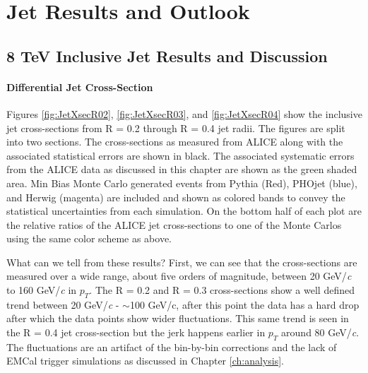 \chapter{Jet Results and Outlook} \label{ch:cando}

\section{8 TeV Inclusive Jet Results and Discussion}

\subsubsection{Differential Jet Cross-Section}


\noindent
Figures \ref{fig:JetXsecR02}, \ref{fig:JetXsecR03}, and \ref{fig:JetXsecR04} show the inclusive jet cross-sections from R = 0.2 through R = 0.4 jet radii.  The figures are split into two sections.  The cross-sections as measured from ALICE along with the associated statistical errors are shown in black.  The associated systematic errors from the ALICE data as discussed in this chapter are shown as the green shaded area.  Min Bias Monte Carlo generated events from Pythia (Red), PHOjet (blue), and Herwig (magenta) are included and shown as colored bands to convey the statistical uncertainties from each simulation.  On the bottom half of each plot are the relative ratios of the ALICE jet cross-sections to one of the Monte Carlos using the same color scheme as above.  

What can we tell from these results?  First, we can see that the cross-sections are measured over a wide range, about five orders of magnitude, between 20 GeV/\textit{c} to 160 GeV/\textit{c} in $p_{T}$.  The R = 0.2 and R = 0.3 cross-sections show a well defined trend between 20 GeV/\textit{c} - $\sim$100 GeV/c, after this point the data  has a hard drop after which the data points show wider fluctuations.  This same trend is seen in the R = 0.4 jet cross-section but the jerk happens earlier in $p_{T}$ around  80 GeV/\textit{c}.  The fluctuations are an artifact of the bin-by-bin corrections and the lack of EMCal trigger simulations as discussed in Chapter \ref{ch:analysis}.  

